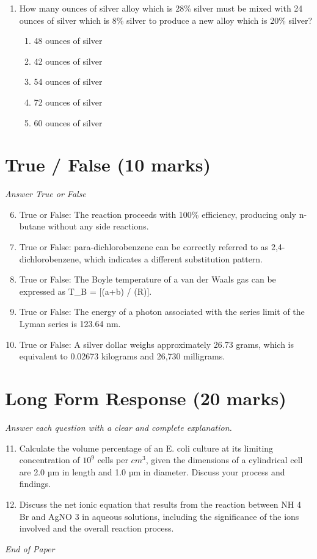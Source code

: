 \documentclass[12pt]{article}
\begin{document}
\begin{enumerate}[label=\arabic*.]
\begin{enumerate}[label=(\alph*)]
    \item H$_{3}$O+ / H$_{2}$O
    \item O$_{2}$ / H$_{2}$O
\end{enumerate}
\item How many ounces of silver alloy which is 28\% silver must be mixed with 24 ounces of silver which is 8\% silver to produce a new alloy which is 20\% silver?
\begin{enumerate}[label=(\alph*)]
    \item 48 ounces of silver
    \item 42 ounces of silver
    \item 54 ounces of silver
    \item 72 ounces of silver
    \item 60 ounces of silver
\end{enumerate}
\end{enumerate}

\section*{True / False (10 marks)}
\textit{Answer True or False}
\begin{enumerate}[label=\arabic*.]
\setcounter{enumi}{5}
\item True or False: The reaction proceeds with 100\% efficiency, producing only n-butane without any side reactions.
\item True or False: para-dichlorobenzene can be correctly referred to as 2,4-dichlorobenzene, which indicates a different substitution pattern.
\item True or False: The Boyle temperature of a van der Waals gas can be expressed as T\_B = [(a+b) / (R)].
\item True or False: The energy of a photon associated with the series limit of the Lyman series is 123.64 nm.
\item True or False: A silver dollar weighs approximately 26.73 grams, which is equivalent to 0.02673 kilograms and 26,730 milligrams.
\end{enumerate}

\section*{Long Form Response (20 marks)}
\textit{Answer each question with a clear and complete explanation.}
\begin{enumerate}[label=\arabic*.]
\setcounter{enumi}{10}
\item Calculate the volume percentage of an E. coli culture at its limiting concentration of $10^9$ cells per $cm^3$, given the dimensions of a cylindrical cell are 2.0 µm in length and 1.0 µm in diameter. Discuss your process and findings.
\item Discuss the net ionic equation that results from the reaction between NH 4 Br and AgNO 3 in aqueous solutions, including the significance of the ions involved and the overall reaction process.
\end{enumerate}

\vfill
\noindent\textit{End of Paper}
\end{document}

